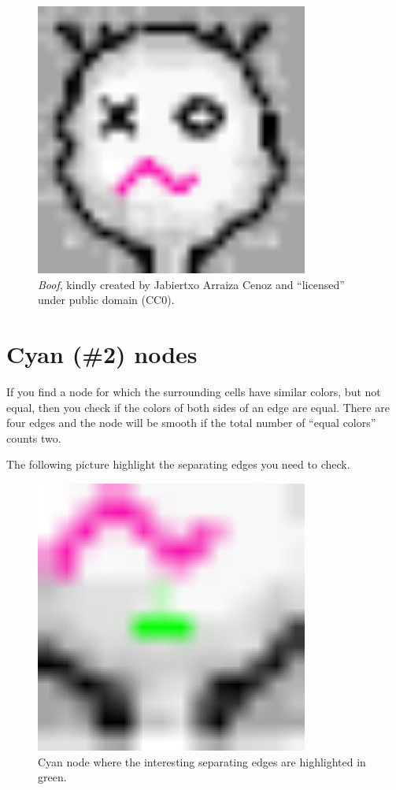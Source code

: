\begin{figure}[H]
  \centering
  \includegraphics[width=0.8\textwidth]{assets/boof_voronoi.pdf}
  \caption{\emph{Boof}, kindly created by Jabiertxo Arraiza Cenoz and
    ``licensed'' under public domain (CC0).}
\end{figure}

\section{Cyan (\#2) nodes}
\label{cyan_nodes}

If you find a node for which the surrounding cells have similar colors, but not
equal, then you check if the colors of both sides of an edge are equal. There
are four edges and the node will be smooth if the total number of ``equal
colors'' counts two.

The following picture highlight the separating edges you need to check.

\begin{figure}[H]
  \centering
  \includegraphics[width=0.8\textwidth]{assets/boof_cyan.pdf}
  \caption{Cyan node where the interesting separating edges are highlighted in
    green.}
\end{figure}

